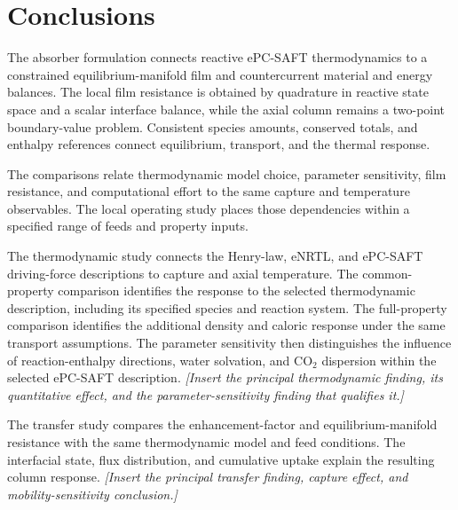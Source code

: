 \section{Conclusions}\label{sec:conclusions}
The absorber formulation connects reactive ePC-SAFT thermodynamics to a constrained equilibrium-manifold film and countercurrent material and energy balances.
The local film resistance is obtained by quadrature in reactive state space and a scalar interface balance, while the axial column remains a two-point boundary-value problem.
Consistent species amounts, conserved totals, and enthalpy references connect equilibrium, transport, and the thermal response.

The comparisons relate thermodynamic model choice, parameter sensitivity, film resistance, and computational effort to the same capture and temperature observables.
The local operating study places those dependencies within a specified range of feeds and property inputs.

The thermodynamic study connects the Henry-law, eNRTL, and ePC-SAFT driving-force descriptions to capture and axial temperature.
The common-property comparison identifies the response to the selected thermodynamic description, including its specified species and reaction system.
The full-property comparison identifies the additional density and caloric response under the same transport assumptions.
The parameter sensitivity then distinguishes the influence of reaction-enthalpy directions, water solvation, and CO$_2$ dispersion within the selected ePC-SAFT description.
\textit{[Insert the principal thermodynamic finding, its quantitative effect, and the parameter-sensitivity finding that qualifies it.]}

The transfer study compares the enhancement-factor and equilibrium-manifold resistance with the same thermodynamic model and feed conditions.
The interfacial state, flux distribution, and cumulative uptake explain the resulting column response.
\textit{[Insert the principal transfer finding, capture effect, and mobility-sensitivity conclusion.]}

